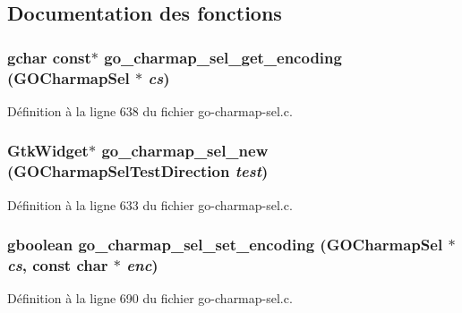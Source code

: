 \subsection{Documentation des fonctions}
\subsubsection[{go\_\-charmap\_\-sel\_\-get\_\-encoding}]{\setlength{\rightskip}{0pt plus 5cm}gchar const$\ast$ go\_\-charmap\_\-sel\_\-get\_\-encoding ({\bf GOCharmapSel} $\ast$ {\em cs})}\label{go-charmap-sel_8h_a17a7ca06cfc5d9a8d0e08f764d50b7f8}


Définition à la ligne 638 du fichier go-\/charmap-\/sel.c.

\subsubsection[{go\_\-charmap\_\-sel\_\-new}]{\setlength{\rightskip}{0pt plus 5cm}GtkWidget$\ast$ go\_\-charmap\_\-sel\_\-new ({\bf GOCharmapSelTestDirection} {\em test})}\label{go-charmap-sel_8h_a68d9a2dfcd7e29cf4585e4d830abfba4}


Définition à la ligne 633 du fichier go-\/charmap-\/sel.c.

\subsubsection[{go\_\-charmap\_\-sel\_\-set\_\-encoding}]{\setlength{\rightskip}{0pt plus 5cm}gboolean go\_\-charmap\_\-sel\_\-set\_\-encoding ({\bf GOCharmapSel} $\ast$ {\em cs}, \/  const char $\ast$ {\em enc})}\label{go-charmap-sel_8h_afaad94b300355324942ac3632d75377b}


Définition à la ligne 690 du fichier go-\/charmap-\/sel.c.

